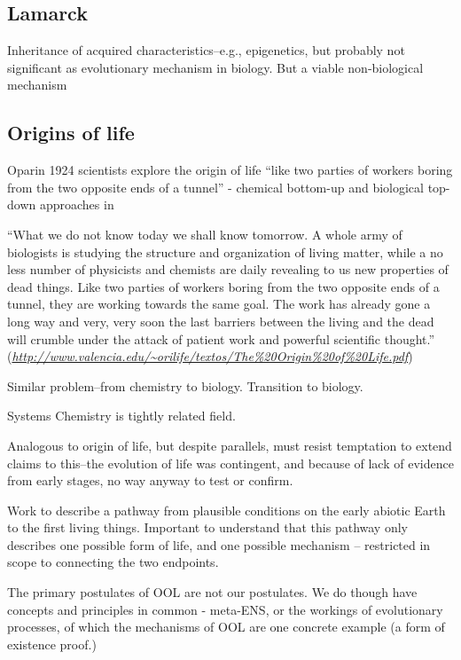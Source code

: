 \subsection{Lamarck}\label{lamarck}

Inheritance of acquired characteristics--e.g., epigenetics, but probably not significant as evolutionary mechanism in biology. But a viable non-biological mechanism

\subsection{Origins of life}

			Oparin 1924 scientists explore the origin of life ``like two parties
			of workers boring from the two opposite ends of a tunnel'' - chemical
			bottom-up and biological top-down approaches in \autocite{Pereto2012}
			
			
			``What we do not know today we shall know tomorrow. A
			whole army of biologists is studying the structure and organization of
			living matter, while a no less number of physicists and chemists are
			daily revealing to us new properties of dead things. Like two parties
			of workers boring from the two opposite ends of a tunnel, they are
			working towards the same goal. The work has already gone a long way
			and very, very soon the last barriers between the living and the dead
			will crumble under the attack of patient work and powerful scientific
			thought.'' (\href{http://www.valencia.edu/~orilife/textos/The\%20Origin\%20of\%20Life.pdf}{\emph{http://www.valencia.edu/\textasciitilde{}orilife/textos/The\%20Origin\%20of\%20Life.pdf}})
			
Similar problem--from chemistry to biology. Transition to biology.

Systems Chemistry is tightly related field.

Analogous to origin of life, but despite parallels, must resist temptation to extend claims to this--the evolution of life was contingent, and because of lack of evidence from early stages, no way anyway to test or confirm.

Work to describe a pathway from plausible conditions on the early abiotic Earth to the first living things. Important to understand that this pathway only describes one possible form of life, and one possible mechanism -- restricted in scope to connecting the two endpoints.

The primary postulates of OOL are not our postulates. We do though have concepts and principles in common - meta-ENS, or the workings of evolutionary processes, of which the mechanisms of OOL are one concrete example (a form of existence proof.)

